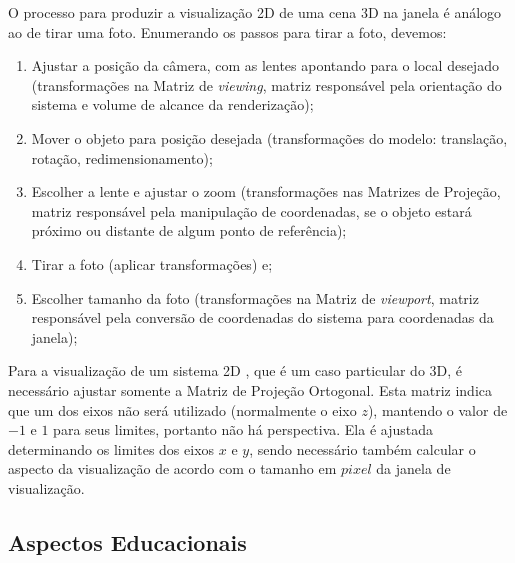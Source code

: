 O processo para produzir a visualização 2D de uma cena 3D na janela é análogo ao de tirar uma foto. Enumerando os passos para tirar a foto, devemos:
\begin{enumerate}
  \item Ajustar a posição da câmera, com as lentes apontando para o local desejado (transformações na Matriz de \emph{viewing}, matriz responsável pela orientação do sistema e volume de alcance da renderização);
  \item Mover o objeto para posição desejada (transformações do modelo: translação, rotação, redimensionamento);
  \item Escolher a lente e ajustar o zoom (transformações nas Matrizes de Projeção, matriz responsável pela manipulação de coordenadas, se o objeto estará próximo ou distante de algum ponto de referência);
  \item Tirar a foto (aplicar transformações) e;
  \item Escolher tamanho da foto (transformações na Matriz de \emph{viewport}, matriz responsável pela conversão de coordenadas do sistema para coordenadas da janela);
\end{enumerate}

Para a visualização de um sistema 2D \cite{CG2D}, que é um caso particular do 3D, é necessário ajustar somente a Matriz de Projeção Ortogonal. Esta matriz indica que um dos eixos não será utilizado (normalmente o eixo $z$), mantendo o valor de $-1$ e $1$ para seus limites, portanto não há perspectiva. Ela é ajustada determinando os limites dos eixos $x$ e $y$, sendo necessário também calcular o aspecto da visualização de acordo com o tamanho em $pixel$ da janela de visualização.



\subsection{Aspectos Educacionais}

